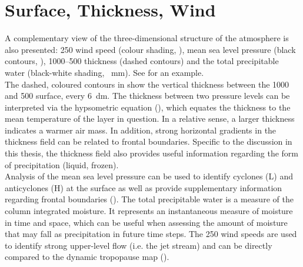 \section{Surface, Thickness, Wind}
\label{sec:Geop}
A complementary view of the three-dimensional structure of the atmosphere is also presented:  \SI{250}{\hPa} wind speed (colour shading, \SI{}{\mPs}), mean sea level pressure (black contours, \SI{}{\hPa}), \num{1000}--\SI{500}{\hPa} thickness (dashed contours) and the total precipitable water (black-white shading, \SI{}{\mm}). See  for an example.
% 
\\
The dashed, coloured contours in  show the vertical thickness between the \SI{1000}{\hPa} and \SI{500}{\hPa} surface, every \SI{6}{\deca\meter}. The thickness between two pressure levels can be interpreted via the hypsometric equation (), which equates the thickness to the mean temperature of the layer in question. In a relative sense, a larger thickness indicates a warmer air mass. In addition, strong horizontal gradients in the thickness field can be related to frontal boundaries. Specific to the discussion in this thesis, the thickness field also provides useful information regarding the form of precipitation (liquid, frozen).
\\
Analysis of the mean sea level pressure can be used to identify cyclones (L) and anticyclones (H) at the surface as well as provide supplementary information regarding frontal boundaries ().
The total precipitable water is a measure of the column integrated moisture. It represents an instantaneous measure of moisture in time and space, which can be useful when assessing the amount of moisture that may fall as precipitation in future time steps.
The \SI{250}{\hPa} wind speeds are used to identify strong upper-level flow (i.e. the jet stream) and can be directly compared to the dynamic tropopause map ().

% 
